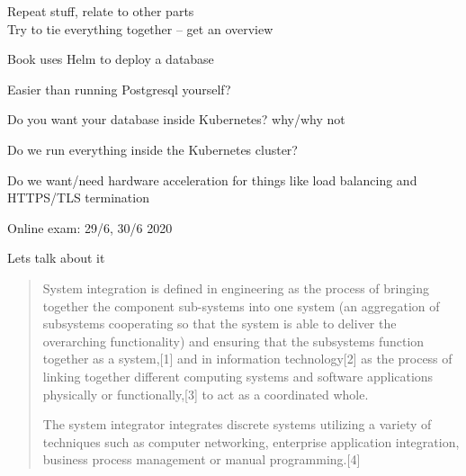\documentclass[Screen16to9,17pt]{foils}
\begin{document}

Repeat stuff, relate to other parts\\
Try to tie everything together -- get an overview




\begin{quote}

\end{quote}

\begin{list2}
  \item Book uses Helm to deploy a database
  \item Easier than running Postgresql yourself?
  \item Do you want your database inside Kubernetes? why/why not
\end{list2}



\begin{quote}

\end{quote}

\begin{list2}
  \item Do we run everything inside the Kubernetes cluster?
  \item Do we want/need hardware acceleration for things like load balancing and HTTPS/TLS termination
\end{list2}



Online exam: 29/6, 30/6 2020

Lets talk about it



\begin{quote}
  System integration is defined in engineering as the process of bringing together the component sub-systems into one system (an aggregation of subsystems cooperating so that the system is able to deliver the overarching functionality) and ensuring that the subsystems function together as a system,[1] and in information technology[2] as the process of linking together different computing systems and software applications physically or functionally,[3] to act as a coordinated whole.

  The system integrator integrates discrete systems utilizing a variety of techniques such as computer networking, enterprise application integration, business process management or manual programming.[4]
\end{quote}
\end{document}
